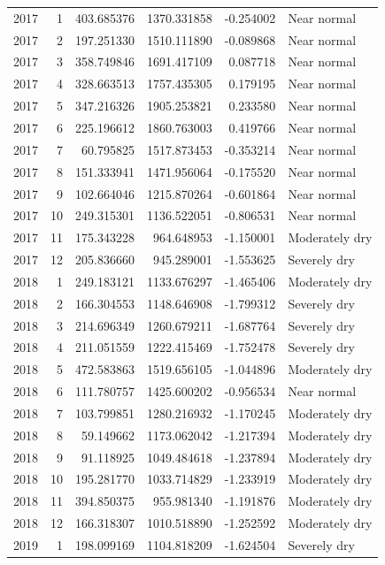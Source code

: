 \begin{tabular}{rrrrrl}
2017 & 1 & 403.685376 & 1370.331858 & -0.254002 & Near normal \\
2017 & 2 & 197.251330 & 1510.111890 & -0.089868 & Near normal \\
2017 & 3 & 358.749846 & 1691.417109 & 0.087718 & Near normal \\
2017 & 4 & 328.663513 & 1757.435305 & 0.179195 & Near normal \\
2017 & 5 & 347.216326 & 1905.253821 & 0.233580 & Near normal \\
2017 & 6 & 225.196612 & 1860.763003 & 0.419766 & Near normal \\
2017 & 7 & 60.795825 & 1517.873453 & -0.353214 & Near normal \\
2017 & 8 & 151.333941 & 1471.956064 & -0.175520 & Near normal \\
2017 & 9 & 102.664046 & 1215.870264 & -0.601864 & Near normal \\
2017 & 10 & 249.315301 & 1136.522051 & -0.806531 & Near normal \\
2017 & 11 & 175.343228 & 964.648953 & -1.150001 & Moderately dry \\
2017 & 12 & 205.836660 & 945.289001 & -1.553625 & Severely dry \\
2018 & 1 & 249.183121 & 1133.676297 & -1.465406 & Moderately dry \\
2018 & 2 & 166.304553 & 1148.646908 & -1.799312 & Severely dry \\
2018 & 3 & 214.696349 & 1260.679211 & -1.687764 & Severely dry \\
2018 & 4 & 211.051559 & 1222.415469 & -1.752478 & Severely dry \\
2018 & 5 & 472.583863 & 1519.656105 & -1.044896 & Moderately dry \\
2018 & 6 & 111.780757 & 1425.600202 & -0.956534 & Near normal \\
2018 & 7 & 103.799851 & 1280.216932 & -1.170245 & Moderately dry \\
2018 & 8 & 59.149662 & 1173.062042 & -1.217394 & Moderately dry \\
2018 & 9 & 91.118925 & 1049.484618 & -1.237894 & Moderately dry \\
2018 & 10 & 195.281770 & 1033.714829 & -1.233919 & Moderately dry \\
2018 & 11 & 394.850375 & 955.981340 & -1.191876 & Moderately dry \\
2018 & 12 & 166.318307 & 1010.518890 & -1.252592 & Moderately dry \\
2019 & 1 & 198.099169 & 1104.818209 & -1.624504 & Severely dry \\

\end{tabular}
